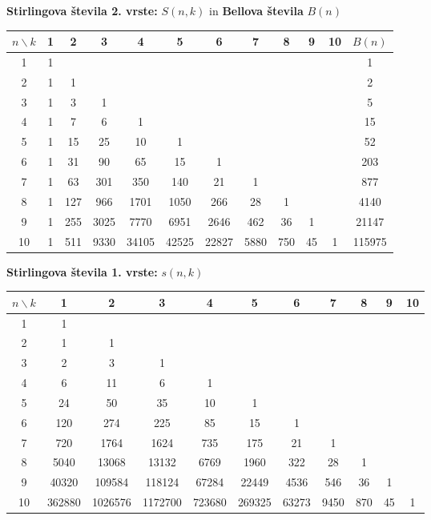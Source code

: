\documentclass[a4paper, oneside, 10pt]{article}
\theoremstyle{definition}
\begin{document}
{\textbf{Stirlingova števila 2. vrste:} $S(n, k)$ in \textbf{Bellova števila} $B(n)$\\
\begin{tabular}{|*{12}{c|}}
  \hline
  $n \backslash k$ & 1&2&3&4&5&6&7&8&9&10&$B(n)$ \\ \hline
  1 & 1 &  &  &  &  &  &  &  &  & & 1 \\ \hline
  2 & 1 & 1 &  &  &  &  &  &  &  & & 2 \\ \hline
  3 & 1 & 3 & 1 &  &  &  &  &  &  & & 5 \\ \hline
  4 & 1 & 7 & 6 & 1 &  &  &  &  &  & & 15 \\ \hline
  5 & 1 & 15 & 25 & 10 & 1 &  &  &  &  & & 52 \\ \hline
  6 & 1 & 31 & 90 & 65 & 15 & 1 &  &  &  & & 203\\ \hline
  7 & 1 & 63 & 301 & 350 & 140 & 21 & 1 &  &  & & 877 \\ \hline
  8 & 1 & 127 & 966 & 1701 & 1050 & 266 & 28 & 1 &  & & 4140 \\ \hline
  9 & 1 & 255 & 3025 & 7770 & 6951 & 2646 & 462 & 36 & 1 & & 21147 \\ \hline
  10 & 1 & 511 & 9330 & 34105 & 42525 & 22827 & 5880 & 750 & 45 & 1 & 115975 \\ \hline
\end{tabular}

\textbf{Stirlingova števila 1. vrste:} $s(n, k)$ \\
\begin{tabular}{|*{11}{c|}}
  \hline
  $n \backslash k$ & 1&2&3&4&5&6&7&8&9&10 \\ \hline
  1 & 1 &  &  &  &  &  &  &  &  & \\ \hline
  2 & 1 & 1 &  &  &  &  &  &  &  & \\ \hline
  3 & 2 & 3 & 1 &  &  &  &  &  &  & \\ \hline
  4 & 6 & 11 & 6 & 1 &  &  &  &  &  & \\ \hline
  5 & 24 & 50 & 35 & 10 & 1 &  &  &  &  & \\ \hline
  6 & 120 & 274 & 225 & 85 & 15 & 1 &  &  &  & \\ \hline
  7 & 720 & 1764 & 1624 & 735 & 175 & 21 & 1 &  &  & \\ \hline
  8 & 5040 & 13068 & 13132 & 6769 & 1960 & 322 & 28 & 1 &  & \\ \hline
  9 & 40320 & 109584 & 118124 & 67284 & 22449 & 4536 & 546 & 36 & 1 & \\ \hline
  10 & 362880 & 1026576 & 1172700 & 723680 & 269325 & 63273 & 9450 & 870 & 45 & 1\\ \hline
\end{tabular}

}
\end{document}
